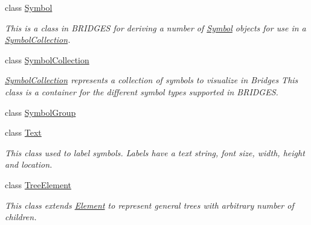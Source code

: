 \begin{DoxyCompactItemize}
class \hyperlink{classbridges_1_1base_1_1_symbol}{Symbol}
\begin{DoxyCompactList}\small\item\em This is a class in B\+R\+I\+D\+G\+ES for deriving a number of \hyperlink{classbridges_1_1base_1_1_symbol}{Symbol} objects for use in a \hyperlink{classbridges_1_1base_1_1_symbol_collection}{Symbol\+Collection}. \end{DoxyCompactList}\item 
class \hyperlink{classbridges_1_1base_1_1_symbol_collection}{Symbol\+Collection}
\begin{DoxyCompactList}\small\item\em \hyperlink{classbridges_1_1base_1_1_symbol_collection}{Symbol\+Collection} represents a collection of symbols to visualize in Bridges This class is a container for the different symbol types supported in B\+R\+I\+D\+G\+ES. \end{DoxyCompactList}\item 
class \hyperlink{classbridges_1_1base_1_1_symbol_group}{Symbol\+Group}
\item 
class \hyperlink{classbridges_1_1base_1_1_text}{Text}
\begin{DoxyCompactList}\small\item\em This class used to label symbols. Labels have a text string, font size, width, height and location. \end{DoxyCompactList}\item 
class \hyperlink{classbridges_1_1base_1_1_tree_element}{Tree\+Element}
\begin{DoxyCompactList}\small\item\em This class extends \hyperlink{classbridges_1_1base_1_1_element}{Element} to represent general trees with arbitrary number of children. \end{DoxyCompactList}\end{DoxyCompactItemize}
